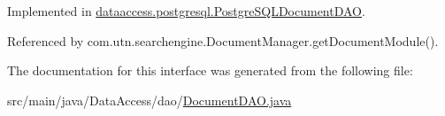 \-Implemented in \hyperlink{classdataaccess_1_1postgresql_1_1_postgre_s_q_l_document_d_a_o_a8129984712142f8220304815ff2c2a19}{dataaccess.\-postgresql.\-Postgre\-S\-Q\-L\-Document\-D\-A\-O}.



\-Referenced by com.\-utn.\-searchengine.\-Document\-Manager.\-get\-Document\-Module().



\-The documentation for this interface was generated from the following file\-:\begin{DoxyCompactItemize}
\item 
src/main/java/\-Data\-Access/dao/\hyperlink{_document_d_a_o_8java}{\-Document\-D\-A\-O.\-java}\end{DoxyCompactItemize}
